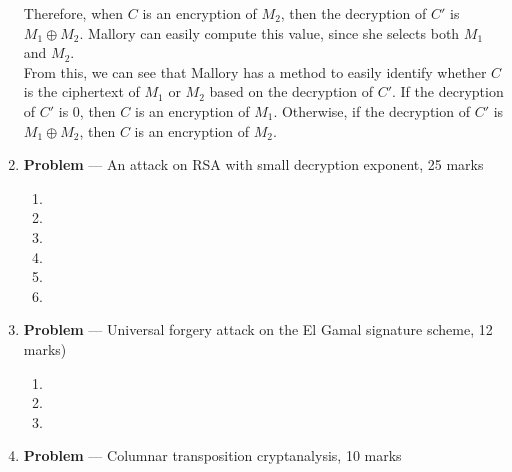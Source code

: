 \documentclass[11pt]{article}
\theoremstyle{definition}
\newcounter{problem}
\begin{document}
\begin{enumerate}
    Therefore, when $C$ is an encryption of $M_2$, then the decryption of $C'$ is $M_1 \oplus M_2$. Mallory can easily compute this value, since she selects both $M_1$ and $M_2$. \\
    
    From this, we can see that Mallory has a method to easily identify whether $C$ is the ciphertext of $M_1$ or $M_2$ based on the decryption of $C'$. If the decryption of $C'$ is 0, then $C$ is an encryption of $M_1$. Otherwise, if the decryption of $C'$ is $M_1 \oplus M_2$, then $C$ is an encryption of $M_2$.
    

\newpage

\item[]  \textbf{Problem \theproblem} --- An attack on RSA with small decryption exponent, 25
    marks

\begin{enumerate}

\item %

\item %

\item %

\item %

\item %

\item %

\end{enumerate}

\newpage

\item[] \textbf{Problem \theproblem} --- Universal forgery attack on the El Gamal signature
    scheme, 12 marks)

\begin{enumerate}

\item %

\item %

\item %

\end{enumerate}

\newpage

 

\item[] \textbf{Problem \theproblem} --- Columnar transposition cryptanalysis, 10 marks

\end{enumerate}
\end{document}

